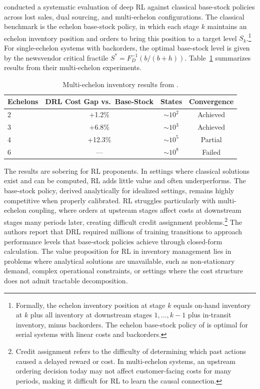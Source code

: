 \citet{Gijsbrechts2022inventory} conducted a systematic evaluation of deep RL against classical base-stock policies across lost sales, dual sourcing, and multi-echelon configurations. The classical benchmark is the echelon base-stock policy, in which each stage $k$ maintains an echelon inventory position and orders to bring this position to a target level $S_k$.\footnote{Formally, the echelon inventory position at stage $k$ equals on-hand inventory at $k$ plus all inventory at downstream stages $1, \ldots, k-1$ plus in-transit inventory, minus backorders. The echelon base-stock policy of \citet{ClarkScarf1960inventory} is optimal for serial systems with linear costs and backorders.} For single-echelon systems with backorders, the optimal base-stock level is given by the newsvendor critical fractile $S^* = F_D^{-1}(b/(b+h))$. Table~\ref{tab:inventory_results} summarizes results from their multi-echelon experiments.

\begin{table}[htbp]
\centering
\caption{Multi-echelon inventory results from \citet{Gijsbrechts2022inventory}.}
\label{tab:inventory_results}
\begin{tabular}{lccc}
\toprule
Echelons & DRL Cost Gap vs.\ Base-Stock & States & Convergence \\
\midrule
2 & +1.2\% & $\sim 10^2$ & Achieved \\
3 & +6.8\% & $\sim 10^3$ & Achieved \\
4 & +12.3\% & $\sim 10^5$ & Partial \\
6 & --- & $\sim 10^8$ & Failed \\
\bottomrule
\end{tabular}
\end{table}

The results are sobering for RL proponents. In settings where classical solutions exist and can be computed, RL adds little value and often underperforms. The base-stock policy, derived analytically for idealized settings, remains highly competitive when properly calibrated. RL struggles particularly with multi-echelon coupling, where orders at upstream stages affect costs at downstream stages many periods later, creating difficult credit assignment problems.\footnote{Credit assignment refers to the difficulty of determining which past actions caused a delayed reward or cost. In multi-echelon systems, an upstream ordering decision today may not affect customer-facing costs for many periods, making it difficult for RL to learn the causal connection.} The authors report that DRL required millions of training transitions to approach performance levels that base-stock policies achieve through closed-form calculation. The value proposition for RL in inventory management lies in problems where analytical solutions are unavailable, such as non-stationary demand, complex operational constraints, or settings where the cost structure does not admit tractable decomposition.


